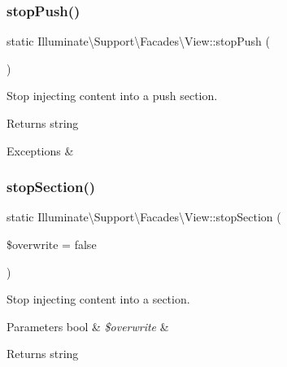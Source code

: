 \subsubsection{\texorpdfstring{stop\+Push()}{stopPush()}}
{\footnotesize\ttfamily static Illuminate\textbackslash{}\+Support\textbackslash{}\+Facades\textbackslash{}\+View\+::stop\+Push (\begin{DoxyParamCaption}{ }\end{DoxyParamCaption})\hspace{0.3cm}{\ttfamily [static]}}

Stop injecting content into a push section.

\begin{DoxyReturn}{Returns}
string 
\end{DoxyReturn}

\begin{DoxyExceptions}{Exceptions}
{\em } & \\
\hline
\end{DoxyExceptions}
\mbox{\label{class_illuminate_1_1_support_1_1_facades_1_1_view_a45915b47e73f64242baf0989f43480a9}} 
\subsubsection{\texorpdfstring{stop\+Section()}{stopSection()}}
{\footnotesize\ttfamily static Illuminate\textbackslash{}\+Support\textbackslash{}\+Facades\textbackslash{}\+View\+::stop\+Section (\begin{DoxyParamCaption}\item[{}]{\$overwrite = {\ttfamily false} }\end{DoxyParamCaption})\hspace{0.3cm}{\ttfamily [static]}}

Stop injecting content into a section.


\begin{DoxyParams}[1]{Parameters}
bool & {\em \$overwrite} & \\
\hline
\end{DoxyParams}
\begin{DoxyReturn}{Returns}
string 
\end{DoxyReturn}

